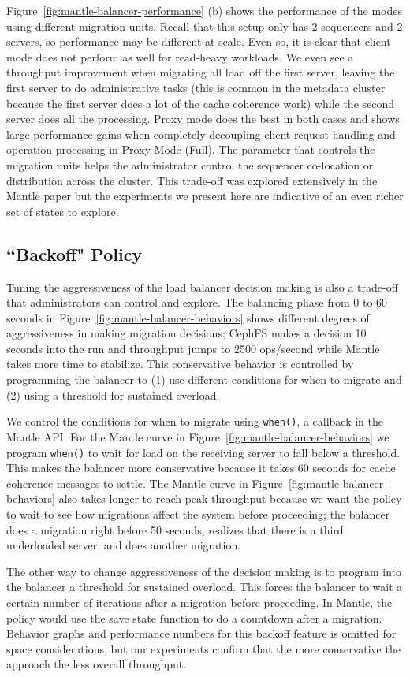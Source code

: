 Figure~\ref{fig:mantle-balancer-performance} (b) shows the performance of the
modes using different migration units. Recall that this setup only has 2
sequencers and 2 servers, so performance may be different at scale. Even so, it
is clear that client mode does not perform as well for read-heavy workloads. We
even see a throughput improvement when migrating all load off the first server,
leaving the first server to do administrative tasks (this is common in the
metadata cluster because the first server does a lot of the cache coherence
work) while the second server does all the processing. Proxy mode does the
best in both cases and shows large performance gains when completely decoupling
client request handling and operation processing in Proxy Mode (Full).  The
parameter that controls the migration units helps the administrator control the
sequencer co-location or distribution across the cluster. This trade-off was
explored extensively in the Mantle paper but the experiments we present here
are indicative of an even richer set of states to explore.

\subsection{``Backoff" Policy}
\label{sec:feature-backoff}

Tuning the aggressiveness of the load balancer decision making is also a
trade-off that administrators can control and explore. The balancing phase from
0 to 60 seconds in Figure~\ref{fig:mantle-balancer-behaviors} shows different
degrees of aggressiveness in making migration decisions; CephFS makes a
decision 10 seconds into the run and throughput jumps to 2500 ops/second 
while Mantle takes more time to stabilize. This conservative behavior is
controlled by programming the balancer to (1) use different conditions for when
to migrate and (2) using a threshold for sustained overload. 

We control the conditions for when to migrate using \texttt{when()}, a callback
in the Mantle API.  For the Mantle curve in
Figure~\ref{fig:mantle-balancer-behaviors} we program \texttt{when()} to wait
for load on the receiving server to fall below a threshold. This makes the
balancer more conservative because it takes 60 seconds for cache coherence
messages to settle.  The Mantle curve in
Figure~\ref{fig:mantle-balancer-behaviors} also takes longer to reach peak
throughput because we want the policy to wait to see how migrations affect the
system before proceeding; the balancer does a migration right before 50
seconds, realizes that there is a third underloaded server, and does another
migration. 

The other way to change aggressiveness of the decision making is to program
into the balancer a threshold for sustained overload. This forces the balancer
to wait a certain number of iterations after a migration before proceeding. In
Mantle, the policy would use the save state function to do a countdown after a
migration.  Behavior graphs and performance numbers for this backoff feature is
omitted for space considerations, but our experiments confirm that the more
conservative the approach the less overall throughput.
 
